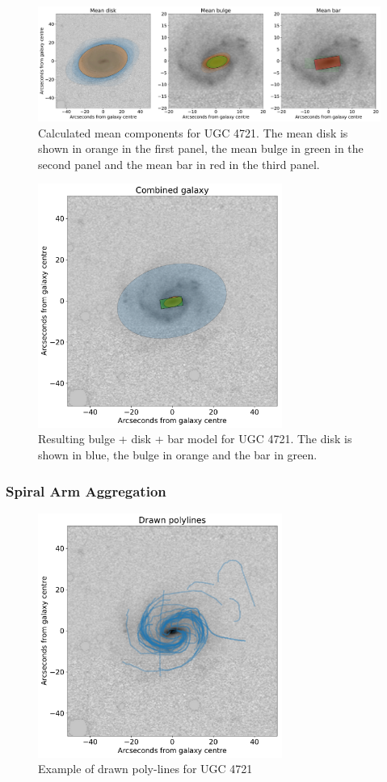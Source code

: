 \documentclass[../main.tex]{subfiles}
\begin{document}
\begin{figure}
  \includegraphics[width=15cm]{images__results/mean_shapes.pdf}
  \caption{Calculated mean components for UGC 4721. The mean disk is shown in orange in the first panel, the mean bulge in green in the second panel and the mean bar in red in the third panel.}
  \label{fig:mean_shapes}
\end{figure}


\begin{figure}
  \includegraphics[width=8cm]{images__results/clustered_shapes.pdf}
  \caption{Resulting bulge + disk + bar model for UGC 4721. The disk is shown in blue, the bulge in orange and the bar in green.}
  \label{fig:clustered_shapes}
\end{figure}


\subsubsection{Spiral Arm Aggregation}
\begin{figure}
  \includegraphics[width=8cm]{images__results/drawn_polylines.pdf}
  \caption{Example of drawn poly-lines for UGC 4721}
  \label{fig:drawn_polylines}
\end{figure}
\end{document}
